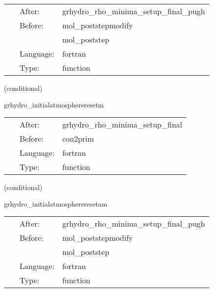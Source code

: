  \begin{tabular*}{160mm}{cll} 
~ & After:  & grhydro\_rho\_minima\_setup\_final\_pugh \\ 
~ & Before:  & mol\_poststepmodify \\ 
~& ~ &mol\_poststep\\ 
~ & Language:  & fortran \\ 
~ & Type:  & function \\ 
\end{tabular*} 


\vspace{5mm}

   (conditional) 

\hspace{5mm} grhydro\_initialatmosphereresetm 

\hspace{5mm}{\it use mask to enforce atmosphere at initial time } 


\hspace{5mm}

 \begin{tabular*}{160mm}{cll} 
~ & After:  & grhydro\_rho\_minima\_setup\_final \\ 
~ & Before:  & con2prim \\ 
~ & Language:  & fortran \\ 
~ & Type:  & function \\ 
\end{tabular*} 


\vspace{5mm}

   (conditional) 

\hspace{5mm} grhydro\_initialatmosphereresetam 

\hspace{5mm}{\it use mask to enforce atmosphere at initial time } 


\hspace{5mm}

 \begin{tabular*}{160mm}{cll} 
~ & After:  & grhydro\_rho\_minima\_setup\_final\_pugh \\ 
~ & Before:  & mol\_poststepmodify \\ 
~& ~ &mol\_poststep\\ 
~ & Language:  & fortran \\ 
~ & Type:  & function \\ 
\end{tabular*} 


